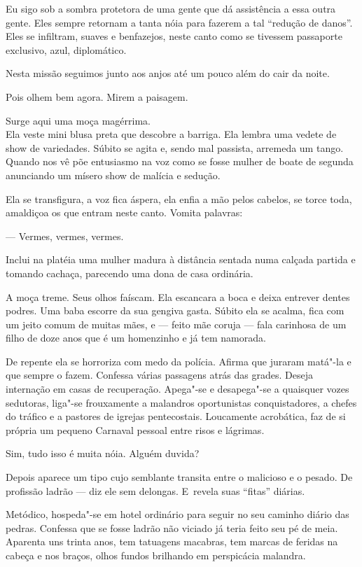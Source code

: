 Eu sigo sob a sombra protetora de uma gente que dá assistência a essa
outra gente. Eles sempre retornam a tanta nóia para fazerem a tal
``redução de danos''. Eles se infiltram, suaves e benfazejos, neste
canto como se tivessem passaporte exclusivo, azul, diplomático.

Nesta missão seguimos junto aos anjos até um pouco além do cair da
noite.

\asterisc{}

Pois olhem bem agora. Mirem a paisagem.

Surge aqui uma moça magérrima.\\ Ela veste mini blusa preta que descobre
a barriga. Ela lembra uma vedete de show de variedades. Súbito se agita
e, sendo mal passista, arremeda um tango. Quando nos vê põe entusiasmo
na voz como se fosse mulher de boate de segunda anunciando um mísero
show de malícia e sedução.

Ela se transfigura, a voz fica áspera, ela enfia a mão pelos cabelos, se
torce toda, amaldiçoa os que entram neste canto. Vomita palavras:

— Vermes, vermes, vermes.

Inclui na platéia uma mulher madura à distância sentada numa calçada
partida e tomando cachaça, parecendo uma dona de casa ordinária.

A moça treme. Seus olhos faíscam. Ela escancara a boca e deixa entrever
dentes podres. Uma baba escorre da sua gengiva gasta. Súbito ela se
acalma, fica com um jeito comum de muitas mães, e --- feito mãe coruja
--- fala carinhosa de um filho de doze anos que é um homenzinho e já tem
namorada.

De repente ela se horroriza com medo da polícia. Afirma que juraram
matá"-la e que sempre o fazem. Confessa várias passagens atrás das
grades. Deseja internação em casas de recuperação. Apega"-se e
desapega"-se a quaisquer vozes sedutoras, liga"-se frouxamente a malandros
oportunistas conquistadores, a chefes do tráfico e a pastores de igrejas
pentecostais. Loucamente acrobática, faz de si própria um pequeno
Carnaval pessoal entre risos e lágrimas.

Sim, tudo isso é muita nóia. Alguém duvida?

\asterisc{}

Depois aparece um tipo cujo semblante transita entre o malicioso e o
pesado. De profissão ladrão --- diz ele sem delongas. E~revela suas
``fitas'' diárias.

Metódico, hospeda"-se em hotel ordinário para seguir no seu caminho
diário das pedras. Confessa que se fosse ladrão não viciado já teria
feito seu pé de meia. Aparenta uns trinta anos, tem tatuagens macabras,
tem marcas de feridas na cabeça e nos braços, olhos fundos brilhando em
perspicácia malandra.

